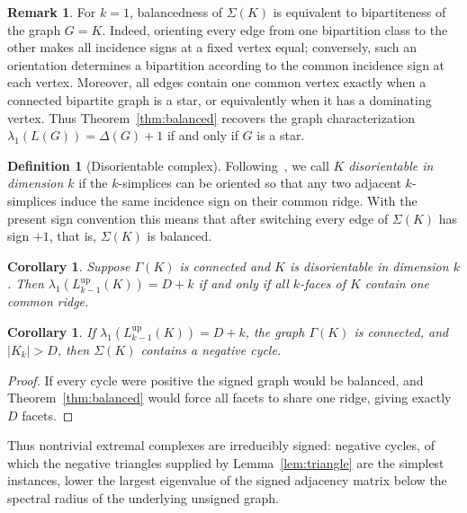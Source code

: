 \documentclass[11pt,reqno]{amsart}
\numberwithin{equation}{section}
\theoremstyle{plain}
\newtheorem{corollary}[theorem]{Corollary}
\theoremstyle{definition}
\newtheorem{definition}[theorem]{Definition}
\newtheorem{remark}[theorem]{Remark}
\newcommand{\Lup}{L^{\mathrm{up}}}
\begin{document}
\begin{remark}
For $k=1$, balancedness of $\Sigma(K)$ is equivalent to bipartiteness of the graph $G=K$.
Indeed, orienting every edge from one bipartition class to the other makes all incidence signs
at a fixed vertex equal; conversely, such an orientation determines a bipartition according to
the common incidence sign at each vertex. Moreover, all edges contain one common vertex exactly
when a connected bipartite graph is a star, or equivalently when it has a dominating vertex.
Thus Theorem~\ref{thm:balanced} recovers the graph characterization
$\lambda_1(L(G))=\Delta(G)+1$ if and only if $G$ is a star.
\end{remark}

\begin{definition}[Disorientable complex]\label{def:disorientable}
Following~\cite{EidiMukherjee}, we call $K$ \emph{disorientable in dimension $k$} if the $k$-simplices can
be oriented so that any two adjacent $k$-simplices induce the same incidence sign on their common
ridge. With the present sign convention this means that after switching every edge of $\Sigma(K)$
has sign $+1$, that is, $\Sigma(K)$ is balanced.
\end{definition}

\begin{corollary}\label{cor:disorientable}
Suppose $\Gamma(K)$ is connected and $K$ is disorientable in dimension $k$. Then
$\lambda_1(\Lup_{k-1}(K))=D+k$ if and only if all $k$-faces of $K$ contain one common ridge.
\end{corollary}

\begin{corollary}\label{cor:negcycle}
If $\lambda_1(\Lup_{k-1}(K))=D+k$, the graph $\Gamma(K)$ is connected, and $|K_k|>D$, then
$\Sigma(K)$ contains a negative cycle.
\end{corollary}

\begin{proof}
If every cycle were positive the signed graph would be balanced, and
Theorem~\ref{thm:balanced} would force all facets to share one ridge, giving exactly $D$
facets.
\end{proof}

Thus nontrivial extremal complexes are irreducibly signed: negative cycles, of which the negative
triangles supplied by Lemma~\ref{lem:triangle} are the simplest instances, lower the largest
eigenvalue of the signed adjacency matrix below the spectral radius of the underlying unsigned
graph.
\end{document}
